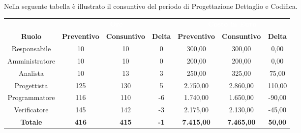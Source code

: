 Nella seguente tabella è illustrato il consuntivo del periodo di Progettazione Dettaglio e Codifica.

\begin{tabular}{c|ccc|ccc}
\rowcolor{greySWEight}
\multicolumn{1}{c}{} & \multicolumn{3}{c}{\textcolor{white}{\textbf{Ore}}} & \multicolumn{3}{c}{\textcolor{white}{\textbf{Costo in Euro}}} \\
{\textbf{Ruolo}} & {\textbf{Preventivo}} & {\textbf{Consuntivo}} & {\textbf{Delta}} & {\textbf{Preventivo}} & {\textbf{Consuntivo}} & {\textbf{Delta}} \\
Responsabile & 10 & 10 & 0 & 300,00 & 300,00 & 0,00 \\
Amministratore & 10 & 10 & 0 & 200,00 & 200,00 & 0,00 \\
Analista & 10 & 13 & 3 & 250,00 & 325,00 & 75,00 \\
Progettista & 125 & 130 & 5 & 2.750,00 & 2.860,00 & 110,00 \\
Programmatore & 116 & 110 & -6 & 1.740,00 & 1.650,00 & -90,00 \\
Verificatore & 145 & 142 & -3 & 2.175,00 & 2.130,00 & -45,00 \\
\hline
\textbf{Totale} & \textbf{416} & \textbf{415} & \textbf{-1} & \textbf{7.415,00} & \textbf{7.465,00} & \textbf{50,00} \\
\end{tabular}